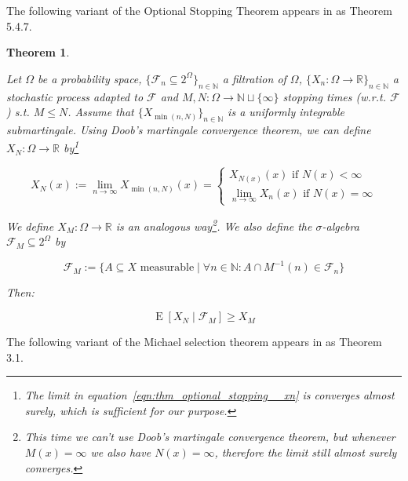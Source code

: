 \documentclass[11pt]{article}
\theoremstyle{definition}
\theoremstyle{plain}
\newtheorem{theorem}{Theorem}%
\newcommand{\Nats}{\mathbb{N}}
\newcommand{\Reals}{\mathbb{R}}
\newcommand{\Sq}[2]{\{#1\}_{#2 \in \Nats}}
\newcommand{\Sqn}[1]{\Sq{#1}{n}}
\DeclareMathOperator{\E}{E}
\newcommand{\F}{\mathcal{F}}
\begin{document}
The following variant of the Optional Stopping Theorem appears in \cite{Durrett_2010} as Theorem 5.4.7.

\begin{samepage}
\begin{theorem}
\label{thm:optional_stopping}

Let ${\Omega}$ be a probability space, ${\Sqn{\F_n \subseteq 2^\Omega}}$ a filtration of ${\Omega}$, ${\Sqn{X_n: \Omega \rightarrow \Reals}}$ a stochastic process adapted to ${\F}$ and ${M,N: \Omega \rightarrow \Nats \sqcup \{\infty\}}$ stopping times (w.r.t. ${\F}$) s.t. ${M \leq N}$. Assume that ${\Sqn{X_{\min\left(n,N\right)}}}$ is a uniformly integrable submartingale. Using Doob's martingale convergence theorem, we can define ${X_N : \Omega \rightarrow \Reals}$ by\footnote{The limit in equation~\ref{eqn:thm_optional_stopping__xn} is converges \emph{almost} surely, which is sufficient for our purpose.}

\begin{equation}
\label{eqn:thm_optional_stopping__xn}
X_N\left(x\right):=\lim_{n \rightarrow \infty} X_{\min\left(n,N\right)}\left(x\right)=\begin{cases}X_{N\left(x\right)}\left(x\right) \text{ if } N\left(x\right) < \infty\\\lim_{n \rightarrow \infty} X_n\left(x\right) \text{ if } N\left(x\right) = \infty\end{cases}
\end{equation}

We define ${X_M: \Omega \rightarrow \Reals}$ is an analogous way\footnote{This time we can't use Doob's martingale convergence theorem, but whenever ${M\left(x\right) = \infty}$ we also have ${N\left(x\right) = \infty}$, therefore the limit still almost surely converges.}. We also define the $\sigma$-algebra ${\F_M \subseteq 2^\Omega}$ by

\begin{equation}
\F_M:=\{A \subseteq X \text{ measurable} \mid \forall n \in \Nats: A \cap M^{-1}\left(n\right) \in \F_n\}
\end{equation}

Then:

\begin{equation}
\E[X_N \mid \F_M] \geq X_M
\end{equation}

\end{theorem}
\end{samepage}

The following variant of the Michael selection theorem appears in \cite{Yannelis_1983} as Theorem 3.1.
\end{document}
